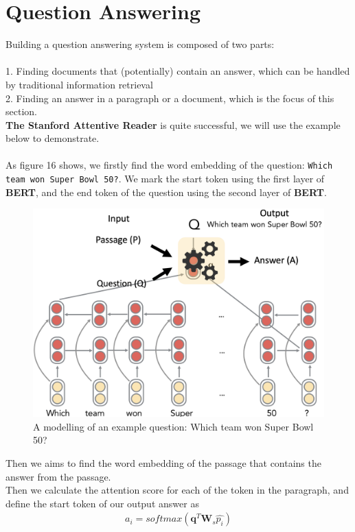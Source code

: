 \documentclass[paper=a4, fontsize=12pt]{scrartcl}
\begin{document}
\section{Question Answering}
Building a question answering system is composed of two parts: \\\\
1. Finding documents that (potentially) contain an answer, which can be handled by traditional information retrieval \\
2. Finding an answer in a paragraph or a document, which is the focus of this section. \\
\textbf{The Stanford Attentive Reader} is quite successful, we will use the example below to demonstrate. \\\\
As figure 16 shows, we firstly find the word embedding of the question: \texttt{Which team won Super Bowl 50?}. We mark the start token using the first layer of \textbf{BERT}, and the end token of the question using the second layer of \textbf{BERT}. \\
 \begin{figure}
  \includegraphics[scale=0.4]{q.png}
  \caption{A modelling of an example question: Which team won Super Bowl 50?}
  \label{fig:skip-gram}
\end{figure}
Then we aims to find the word embedding of the passage that contains the answer from the passage. \\
Then we calculate the attention score for each of the token in the paragraph, and define the start token of our output answer as 
\begin{align*}
a_i = softmax(\mathbf{q}^T \mathbf{W}_s \hat{p_i})
\end{align*}
\end{document}
